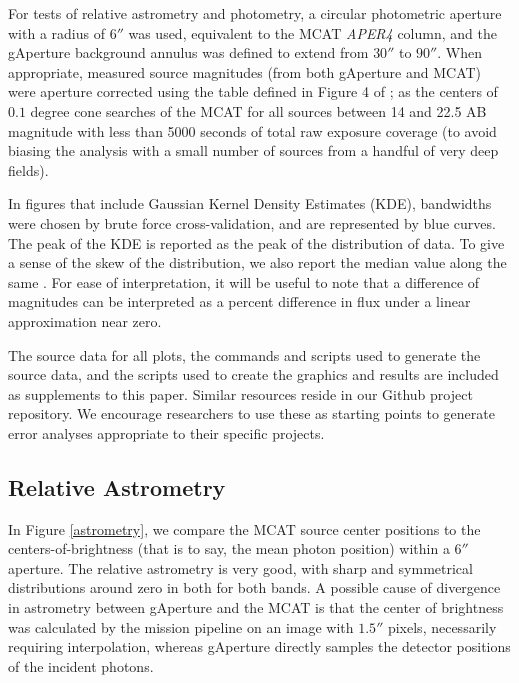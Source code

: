 \documentclass[trackchanges,preprint2]{aastex}
\begin{document}
For tests of relative astrometry and photometry, a circular photometric aperture with a radius of $6''$ was used, equivalent to the MCAT \emph{APER4} column, and the gAperture background annulus was defined to extend from $30''$ to $90''$. When appropriate, measured source magnitudes (from both gAperture and MCAT) were aperture corrected using the table defined in Figure 4 of \citet{mor2007};  as the centers of $0.1$ degree cone searches of the MCAT for all sources between 14 and 22.5 AB magnitude with less than 5000 seconds of total raw exposure coverage (to avoid biasing the analysis with a small number of sources from a handful of very deep fields). 

In figures that include Gaussian Kernel Density Estimates (KDE), bandwidths were chosen by brute force cross-validation, and are represented by blue curves. The peak  of the KDE is reported as the peak of the distribution of data. To give a sense of the skew of the distribution, we also report the median value along the same . For ease of interpretation, it will be useful to note that a difference of magnitudes can be interpreted as a percent difference in flux under a linear approximation near zero.

The source data for all plots, the commands and scripts used to generate the source data, and the scripts used to create the graphics and results are included as supplements to this paper. Similar resources reside in our Github project repository. We encourage researchers to use these as starting points to generate error analyses appropriate to their specific projects.

\subsection{Relative Astrometry}
In Figure \ref{astrometry}, we compare the MCAT source center positions to the centers-of-brightness (that is to say, the mean photon position) within a $6''$ aperture. The relative astrometry is very good, with sharp and symmetrical distributions around zero in both  for both bands. A possible cause of divergence in astrometry between gAperture and the MCAT is that the center of brightness was calculated by the mission pipeline on an image with $1.5''$ pixels, necessarily requiring interpolation, whereas gAperture directly samples the detector positions of the incident photons.
\end{document}

